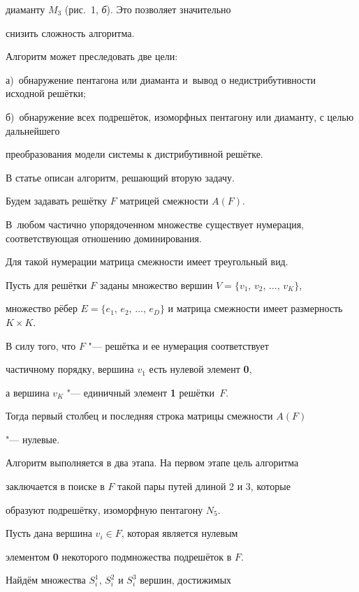 диаманту $M_3$ (рис.~1, {\sl б}). Это позволяет значительно

снизить сложность алгоритма.



Алгоритм может преследовать две цели: 

а)~обнаружение пентагона или диаманта и~вывод о недистрибутивности исходной решётки; 

б)~обнаружение всех подрешёток, изоморфных пентагону или диаманту, с целью дальнейшего

преобразования модели системы к дистрибутивной решётке. 

В статье описан алгоритм, решающий вторую задачу.



Будем задавать решётку $F$ матрицей смежности $A(F)$. 

В~любом частично упорядоченном множестве существует нумерация, соответствующая отношению доминирования. 

Для такой нумерации матрица смежности имеет треугольный вид. 

Пусть для решётки $F$ заданы множество вершин $V= \{ v_1,\,v_2,\,\ldots,\,v_K\}$,

множество рёбер $E=\{e_1,\,e_2,\,\ldots,\,e_D\}$ и матрица смежности имеет размерность $K \times K$.



В силу того, что $F$ "--- решётка и ее нумерация соответствует

частичному порядку, вершина $v_1$ есть нулевой элемент \textbf{0},

а вершина $v_K$ "--- единичный элемент \textbf{1} решётки~$F$.

Тогда первый столбец и последняя строка матрицы смежности $A( F)$

"--- нулевые.



Алгоритм выполняется в два этапа. На первом этапе цель алгоритма

заключается в поиске в $ F$ такой пары путей длиной 2 и 3, которые

образуют подрешётку, изоморфную пентагону $N_5$.



Пусть дана вершина $v_i \in  F$, которая является нулевым

элементом \textbf{0} некоторого подмножества подрешёток в $F$.

Найдём множества $S_i^1$, $S_i^2 $ и $S_i^3 $ вершин, достижимых

